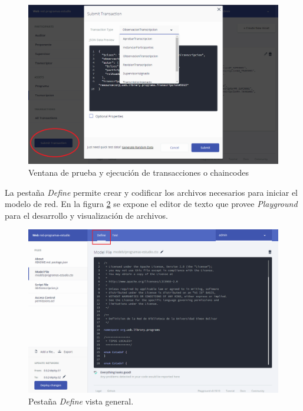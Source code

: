 \begin{figure}[h]
\centering
\includegraphics[width=1\textwidth]{playground5.png}
\caption[Test Transaction Playground]{Ventana de prueba y ejecución de transacciones o chaincodes}
\label{fig: playground-test-transaction}
\end{figure}

La pestaña \textit{Define}  permite crear y codificar los archivos necesarios para iniciar el modelo de red. En la figura \ref{fig: playground-define-principal} se expone el editor de texto que provee \textit{Playground} para el desarrollo y visualización de archivos.

\begin{figure}[h]
\centering
\includegraphics[width=1\textwidth]{playground6.png}
\caption[Define Principal Playground]{Pestaña \textit{Define} vista general.}
\label{fig: playground-define-principal}
\end{figure}

